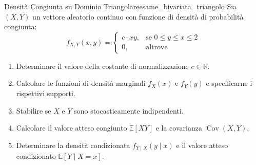 \begin{esercizio}{Densità Congiunta su Dominio Triangolare}{esame_bivariata_triangolo}
Sia $(X, Y)$ un vettore aleatorio continuo con funzione di densità di probabilità congiunta:
\begin{equation*}
    f_{X,Y}(x, y) = \begin{cases}
        c \cdot x y, & \text{se } 0 \le y \le x \le 2 \\
        0, & \text{altrove}
    \end{cases}
\end{equation*}
\begin{enumerate}
    \item Determinare il valore della costante di normalizzazione $c \in \mathbb{R}$.
    \item Calcolare le funzioni di densità marginali $f_X(x)$ e $f_Y(y)$ e specificarne i rispettivi supporti.
    \item Stabilire se $X$ e $Y$ sono stocasticamente indipendenti.
    \item Calcolare il valore atteso congiunto $\mathbb{E}[XY]$ e la covarianza $\operatorname{Cov}(X, Y)$.
    \item Determinare la densità condizionata $f_{Y \mid X}(y \mid x)$ e il valore atteso condizionato $\mathbb{E}[Y \mid X = x]$.
\end{enumerate}
\end{esercizio}

